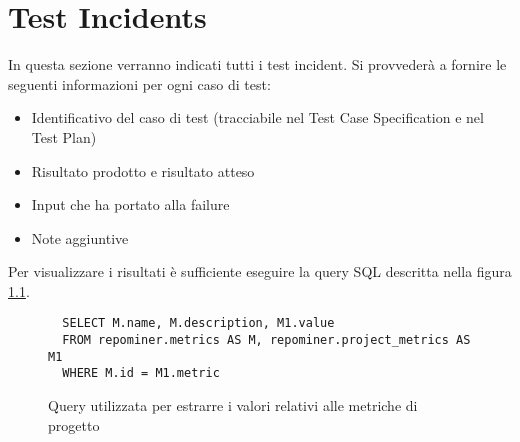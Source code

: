 \chapter{Test Incidents}

In questa sezione verranno indicati tutti i test incident. Si provvederà a fornire le seguenti informazioni per ogni caso di test:
\begin{itemize}
 \item Identificativo del caso di test (tracciabile nel Test Case Specification e nel Test Plan)
 \item Risultato prodotto e risultato atteso
 \item Input che ha portato alla failure
 \item Note aggiuntive
\end{itemize}

Per visualizzare i risultati è sufficiente eseguire la query SQL descritta nella figura \ref{figmetpack}.
\begin{figure}
 \begin{lstlisting}
  SELECT M.name, M.description, M1.value
  FROM repominer.metrics AS M, repominer.project_metrics AS M1 
  WHERE M.id = M1.metric
  \end{lstlisting}
  \caption{\footnotesize Query utilizzata per estrarre i valori relativi alle metriche di progetto}
  \label{figmetpack}
\end{figure}

\newpage
